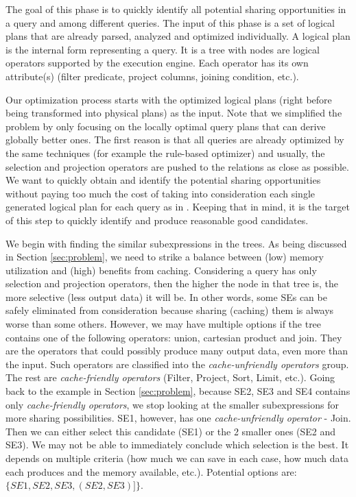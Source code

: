 The goal of this phase is to quickly identify all potential sharing opportunities in a query and among different queries. The input of this phase is a set of logical plans that are already parsed, analyzed and optimized individually. A logical plan is the internal form representing a query. It is a tree with nodes are logical operators supported by the execution engine. Each operator has its own attribute(s) (filter predicate, project columns, joining condition, etc.).

Our optimization process starts with the optimized logical plans (right before being transformed into physical plans) as the input. Note that we simplified the problem by only focusing on the locally optimal query plans that can derive globally better ones. The first reason is that all queries are already optimized by the same techniques (for example the rule-based optimizer) and usually, the selection and projection operators are pushed to the relations as close as possible. We want to quickly obtain and identify the potential sharing opportunities without paying too much the cost of taking into consideration each single generated logical plan for each query as in \cite{zhou2007efficient}. Keeping that in mind, it is the target of this step to quickly identify and produce reasonable good candidates.

We begin with finding the similar subexpressions in the trees. As being discussed in Section \ref{sec:problem}, we need to strike a balance between (low) memory utilization and (high) benefits from caching. Considering a query has only selection and projection operators, then the higher the node in that tree is, the more selective (less output data) it will be. In other words, some SEs can be safely eliminated from consideration because sharing (caching) them is always worse than some others. However, we may have multiple options if the tree contains one of the following operators: union, cartesian product and join. They are the operators that could possibly produce many output data, even more than the input. Such operators are classified into the \emph{cache-unfriendly operators} group. The rest are \emph{cache-friendly operators} (Filter, Project, Sort, Limit, etc.). Going back to the example in Section \ref{sec:problem}, because SE2, SE3 and SE4 contains only \emph{cache-friendly operators}, we stop looking at the smaller subexpressions for more sharing possibilities. SE1, however, has one \emph{cache-unfriendly operator} - Join. Then we can either select this candidate (SE1) or the 2 smaller ones (SE2 and SE3). We may not be able to immediately conclude which selection is the best. It depends on multiple criteria (how much we can save in each case, how much data each produces and the memory available, etc.). Potential options are: $\{SE1, SE2, SE3, (SE2, SE3)]\}$.

